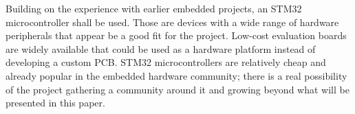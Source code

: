 Building on the experience with earlier embedded projects, an STM32 microcontroller shall be used. Those are \armcm devices with a wide range of hardware peripherals that appear be a good fit for the project. Low-cost evaluation boards are widely available that could be used as a hardware platform instead of developing a custom \gls{PCB}. STM32 microcontrollers are relatively cheap and already popular in the embedded hardware community; there is a real possibility of the project gathering a community around it and growing beyond what will be presented in this paper.

